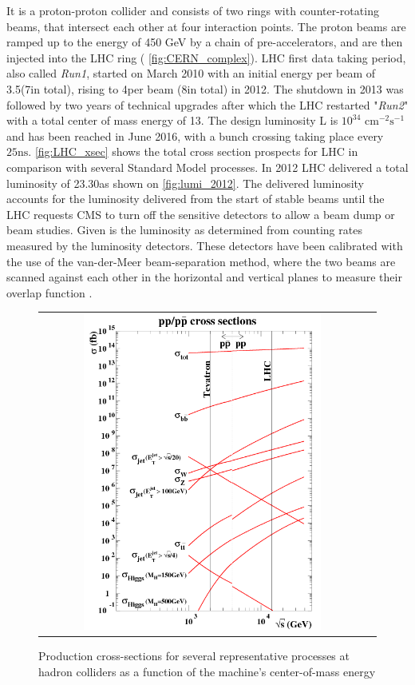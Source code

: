 It is a proton-proton collider and consists of two rings with counter-rotating beams, that intersect each other at four interaction points. The proton beams are ramped up to the energy of 450 GeV by a chain of pre-accelerators, and are then injected into the LHC ring ( \autoref{fig:CERN_complex}). LHC first data taking period, also called \textit{Run1}, started on March 2010 with an initial energy per beam of 3.5\tev (7\tev in total), rising to 4\tev per beam (8\tev in total) in 2012. The shutdown in 2013 was followed by two years of technical upgrades after which the LHC restarted "\textit{Run2}" with a total center of mass energy of 13\tev. The design luminosity L is $10^{34}$ \ensuremath{\text{cm}^{-2}\text{s}^{-1}} and has been reached in June 2016, with a bunch crossing taking place every $25 \text{ns}$. \autoref{fig:LHC_xsec} shows the total cross section prospects for LHC in comparison with several Standard Model processes. In 2012 LHC delivered a total luminosity of 23.30\invfb as shown on \autoref{fig:lumi_2012}. The delivered luminosity accounts for the luminosity delivered from the start of stable beams until the LHC requests CMS to turn off the sensitive detectors to allow a beam dump or beam studies. Given is the luminosity as determined from counting rates measured by the luminosity detectors. These detectors have been calibrated with the use of the van-der-Meer beam-separation method, where the two beams are scanned against each other in the horizontal and vertical planes to measure their overlap function \cite{CMS:LumiPublicResults}.

\begin{figure}[tbh!]
	\centering
	\begin{tabular}{cc}
		\includegraphics[width=0.75\textwidth]{detector/pics/LHC_xsec.png}
	\end{tabular}
	\caption{Production cross-sections for several representative processes at hadron colliders as a function of the machine's center-of-mass energy \cite{Weiglein:2004hn}}
	\label{fig:LHC_xsec}
\end{figure}


